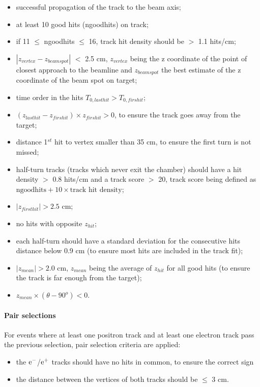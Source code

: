 \begin{refsection}
        \begin{itemize}
            \item successful propagation of the track to the beam axis;
            \item at least 10 good hits (ngoodhits) on track;
            \item if 11 $\leq$ ngoodhits $\leq$ 16, track hit density should be $>$ 1.1 hits/cm;   
            \item $|z_{vertex}-z_{beamspot}|$ $<$ 2.5 cm, $z_{vertex}$ being the z coordinate of the point of closest approach to the beamline and $z_{beamspot}$ the best estimate of the z coordinate of the beam spot on target;
            \item  time order in the hits $T_{0,lasthit}>T_{0,firshit}$;
            \item  $(z_{lasthit}-z_{firshit}) \times z_{firshit} > 0$, to ensure the track goes away from the target;
            \item distance 1$^{st}$ hit to vertex smaller than 35 cm, to ensure the first turn is not missed;
            \item half-turn tracks (tracks which never exit the chamber) should have a hit density $>$ 0.8 hits/cm and a track score $>$ 20, track score being defined as $\mbox{ngoodhits} + 10 \times \mbox{track hit density}$;
            \item  $|z_{firsthit}|>2.5$ cm;
            \item no hits with opposite $z_{hit}$;
            \item each half-turn should have a standard deviation for the consecutive hits distance below 0.9 cm (to ensure most hits are included in the track fit);
            \item $|z_{mean}|>2.0$ cm, $z_{mean}$ being the average of $z_{hit}$ for all good hits (to ensure the track is far enough from the target);
            \item $z_{mean} \times (\theta - 90^o) < 0$.
        \end{itemize}

        \paragraph{Pair selections}
        For events where at least one positron track and at least one electron track pass the previous selection, pair selection criteria are applied:
        \begin{itemize}
            \item the $\text{e}^-$/$\text{e}^+$ tracks should have no hits in common, to ensure the correct sign
            \item the distance between the vertices of both tracks should be $\leq$ 3 cm.
        \end{itemize}



\end{refsection}
